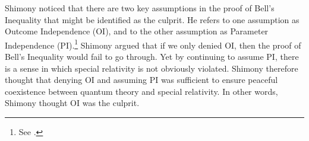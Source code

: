 \documentclass[12pt]{report}
\begin{document}
Shimony noticed that there are two key assumptions in the proof of Bell's Inequality that might be identified as the culprit. He refers to one assumption as {Outcome Independence} (OI), %
%
and to the other assumption as {Parameter Independence} (PI).\footnote{See \cite[146-147]{Shimony86}.}  %
Shimony argued that if we only denied OI, then the proof of Bell's Inequality would fail to go through. Yet by continuing to assume PI, there is a sense in which special relativity is not obviously violated. Shimony therefore thought that denying OI and assuming PI was sufficient to ensure peaceful coexistence between quantum theory and special relativity. In other words, Shimony thought OI was the culprit. 


\end{document}
